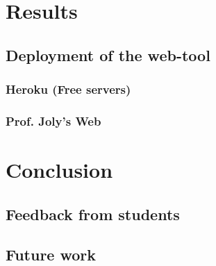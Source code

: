 \chapter{Results}

    \section{Deployment of the web-tool}
        \subsection{Heroku (Free servers)}
        \subsection{Prof. Joly's Web}




\chapter{Conclusion}
    \section{Feedback from students}
    \section{Future work}
